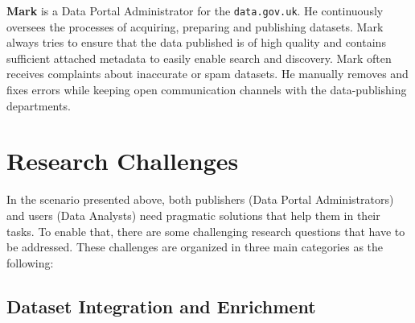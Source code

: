 \textbf{Mark} is a Data Portal Administrator for the \texttt{data.gov.uk}. He continuously oversees the processes of acquiring, preparing and publishing datasets. Mark always tries to ensure that the data published is of high quality and contains sufficient attached metadata to easily enable search and discovery. Mark often receives complaints about inaccurate or spam datasets. He manually removes and fixes errors while keeping open communication channels with the data-publishing departments.

\section{Research Challenges} \label{section:challenges}

In the scenario presented above, both publishers (Data Portal Administrators) and users (Data Analysts) need pragmatic solutions that help them in their tasks. To enable that, there are some challenging research questions that have to be addressed. These challenges are organized in three main categories as the following:

\subsection{Dataset Integration and Enrichment}

